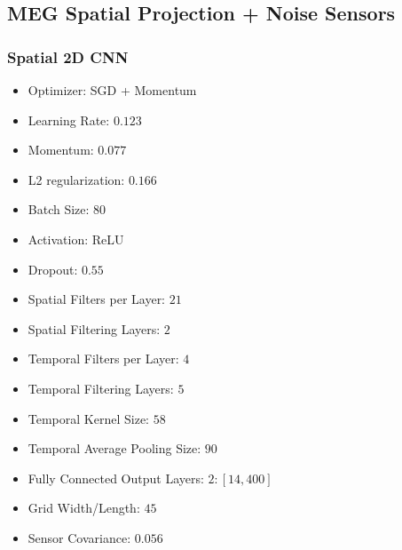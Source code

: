 \subsection{MEG Spatial Projection + Noise Sensors}

\subsubsection{Spatial 2D CNN}

\begin{itemize}
\item Optimizer: SGD + Momentum
\item Learning Rate: $0.123$
\item Momentum: $0.077$
\item L2 regularization: $0.166$
\item Batch Size: $80$
\item Activation: ReLU
\item Dropout: $0.55$
\item Spatial Filters per Layer: $21$
\item Spatial Filtering Layers: $2$
\item Temporal Filters per Layer: $4$
\item Temporal Filtering Layers: $5$
\item Temporal Kernel Size: $58$
\item Temporal Average Pooling Size: $90$
\item Fully Connected Output Layers: $2: [14, 400]$
\item Grid Width/Length: $45$
\item Sensor Covariance: $0.056$
\end{itemize}

